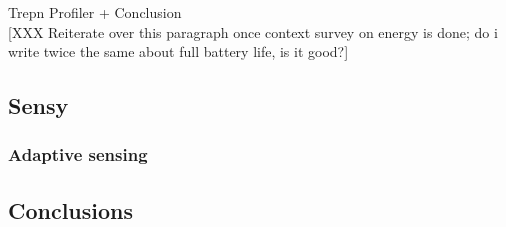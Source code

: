 Trepn Profiler + Conclusion\\

[XXX Reiterate over this paragraph once context survey on energy is done;
	do i write twice the same about full battery life, is it good?]			
			
		
		
		
\subsection{Sensy}
\label{s:design:sensy}

\subsubsection{Adaptive sensing}
\label{s:design:sensy:adaptive}

\subsection{Conclusions}
\label{s:design:conclusions}

